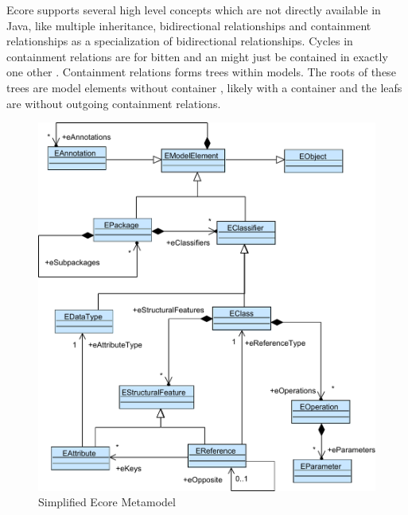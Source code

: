 Ecore supports several high level concepts which are not directly available in Java, like multiple inheritance, bidirectional relationships and containment relationships as a specialization of bidirectional relationships. Cycles in containment relations are for bitten and an  might just be contained in exactly one other . Containment relations forms trees within models. The roots of these trees are model elements without container , likely with a container  and the leafs are  without outgoing containment relations. 

\begin{figure}
\centering
\includegraphics[scale=0.9]{gfx/ex/Ecore} 
\caption{Simplified Ecore Metamodel}
\label{MM:Ecore}
\end{figure}
	
